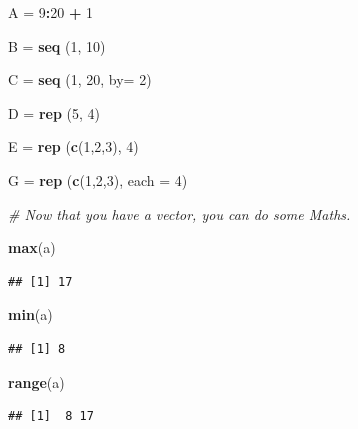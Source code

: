\documentclass[]{book}
\newenvironment{Shaded}{\begin{snugshade}}{\end{snugshade}}
\newcommand{\KeywordTok}[1]{\textcolor[rgb]{0.13,0.29,0.53}{\textbf{#1}}}
\newcommand{\DataTypeTok}[1]{\textcolor[rgb]{0.13,0.29,0.53}{#1}}
\newcommand{\DecValTok}[1]{\textcolor[rgb]{0.00,0.00,0.81}{#1}}
\newcommand{\StringTok}[1]{\textcolor[rgb]{0.31,0.60,0.02}{#1}}
\newcommand{\CommentTok}[1]{\textcolor[rgb]{0.56,0.35,0.01}{\textit{#1}}}
\newcommand{\OperatorTok}[1]{\textcolor[rgb]{0.81,0.36,0.00}{\textbf{#1}}}
\newcommand{\NormalTok}[1]{#1}
\begin{document}
\begin{Shaded}
\begin{Highlighting}[]
\NormalTok{A =}\StringTok{ }\DecValTok{9}\OperatorTok{:}\DecValTok{20} \OperatorTok{+}\StringTok{ }\DecValTok{1}

\NormalTok{B =}\StringTok{ }\KeywordTok{seq}\NormalTok{ (}\DecValTok{1}\NormalTok{, }\DecValTok{10}\NormalTok{)}

\NormalTok{C =}\StringTok{ }\KeywordTok{seq}\NormalTok{ (}\DecValTok{1}\NormalTok{, }\DecValTok{20}\NormalTok{, }\DataTypeTok{by=} \DecValTok{2}\NormalTok{)}

\NormalTok{D =}\StringTok{ }\KeywordTok{rep}\NormalTok{ (}\DecValTok{5}\NormalTok{, }\DecValTok{4}\NormalTok{)}

\NormalTok{E =}\StringTok{ }\KeywordTok{rep}\NormalTok{ (}\KeywordTok{c}\NormalTok{(}\DecValTok{1}\NormalTok{,}\DecValTok{2}\NormalTok{,}\DecValTok{3}\NormalTok{), }\DecValTok{4}\NormalTok{)}

\NormalTok{G =}\StringTok{ }\KeywordTok{rep}\NormalTok{ (}\KeywordTok{c}\NormalTok{(}\DecValTok{1}\NormalTok{,}\DecValTok{2}\NormalTok{,}\DecValTok{3}\NormalTok{), }\DataTypeTok{each =} \DecValTok{4}\NormalTok{)}

\CommentTok{# Now that you have a vector, you can do some Maths.}

\KeywordTok{max}\NormalTok{(a)}
\end{Highlighting}
\end{Shaded}

\begin{verbatim}
## [1] 17
\end{verbatim}

\begin{Shaded}
\begin{Highlighting}[]
\KeywordTok{min}\NormalTok{(a)}
\end{Highlighting}
\end{Shaded}

\begin{verbatim}
## [1] 8
\end{verbatim}

\begin{Shaded}
\begin{Highlighting}[]
\KeywordTok{range}\NormalTok{(a)}
\end{Highlighting}
\end{Shaded}

\begin{verbatim}
## [1]  8 17
\end{verbatim}
\end{document}
